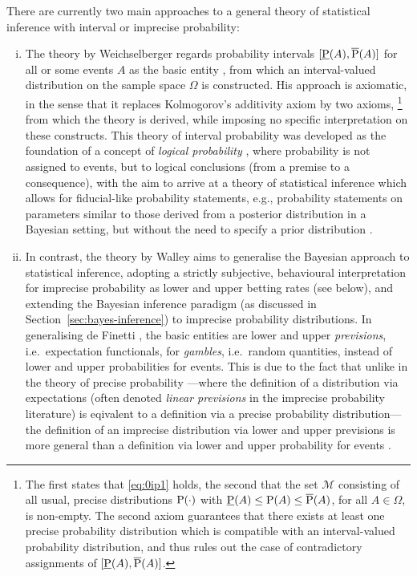 There are currently two main approaches to a general theory of statistical inference with interval or imprecise probability:
\begin{enumerate}[(i)]
\item The theory by Weichselberger \parencite*{2000:weichselberger, 2001:weichselberger}
regards probability intervals $[\underline{\operatorname{P}}(A), \overline{\operatorname{P}}(A)]$ for all or some events $A$ as the basic entity
\parencite[p.~646]{2011:IESS-ip},
from which an interval-valued distribution on the sample space $\Omega$ is constructed.
His approach is axiomatic, in the sense that it replaces Kolmogorov's \parencite*{1933:kolmogorov} additivity axiom by two axioms,%
\footnote{The first states that \eqref{eq:0ip1} holds,
the second that the set $\mathcal{M}$ consisting of all usual, precise distributions $\operatorname{P}(\cdot)$
with $\underline{\operatorname{P}}(A) \le \operatorname{P}(A) \le \overline{\operatorname{P}}(A)$, for all $A \in \Omega$, is non-empty.
The second axiom guarantees that there exists at least one precise probability distribution
which is compatible with an interval-valued probability distribution,
and thus rules out the case of contradictory assignments of $[\underline{\operatorname{P}}(A), \overline{\operatorname{P}}(A)]$.}
from which the theory is derived,
while imposing no specific interpretation on these constructs.
This theory of interval probability was developed
as the foundation of a concept of \emph{logical probability} \parencite{2007:weichselberger},
where probability is not assigned to events, but to logical conclusions (from a premise to a consequence),
with the aim to arrive at a theory of statistical inference
which allows for fiducial-like probability statements,
e.g., probability statements on parameters similar to those derived from a posterior distribution in a Bayesian setting,
but without the need to specify a prior distribution \parencite[see, e.g.,][]{2011:IESS-fiducial}.
\item In contrast, the theory by Walley \parencite*{1991:walley, 2000:walley::towards}
aims to generalise the Bayesian approach to statistical inference,
adopting a strictly subjective, behavioural interpretation for imprecise probability
as lower and upper betting rates (see below),
and extending the Bayesian inference paradigm (as discussed in Section~\ref{sec:bayes-inference})
to imprecise probability distributions.
In generalising de Finetti \parencite*{1937:finetti,1970:finetti}, the basic entities are lower and upper \emph{previsions},
i.e.\ expectation functionals, for \emph{gambles}, i.e.\ random quantities,
instead of lower and upper probabilities for events.
This is due to the fact that unlike in the theory of precise probability%
---where the definition of a distribution via expectations %
(often denoted \emph{linear previsions} in the imprecise probability literature)
is eqivalent to a definition via a precise probability distribution---%
the definition of an imprecise distribution via lower and upper previsions
is more general than a definition via lower and upper probability for events
\parencite[p.~132]{2000:walley::towards}.
\end{enumerate}
